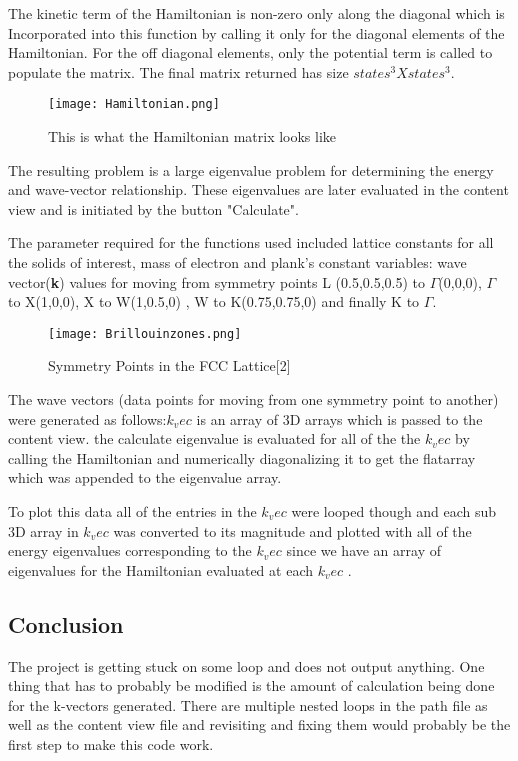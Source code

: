 \documentclass[%
 reprint,
 amsmath,amssymb,
 aps,
]{revtex4-2}
\begin{document}
The kinetic term of the Hamiltonian is non-zero only along the diagonal which is Incorporated into this function by calling it only for the diagonal elements of the Hamiltonian. For the off diagonal elements, only the potential term is called to populate the matrix. The final matrix returned has size $states^3 X states^3 $. \\

\begin{figure}[H]
\texttt{[image: Hamiltonian.png]}%
\caption{\label{fig:Hamiltonian} This is what the Hamiltonian matrix looks like}
\end{figure}

The resulting problem is a large eigenvalue problem for determining the energy and wave-vector relationship. These eigenvalues are later evaluated in the content view and is initiated by the button "Calculate".

The parameter required for the functions used included lattice constants for all the solids of interest, mass of electron and plank's constant  
variables: wave vector(\textbf{k}) values for moving from symmetry points L (0.5,0.5,0.5) to $\Gamma$(0,0,0), $\Gamma$ to X(1,0,0), X to W(1,0.5,0) , W to K(0.75,0.75,0) and finally K to $\Gamma$. 

\begin{figure}[H]
\texttt{[image: Brillouinzones.png]}%
\caption{\label{fig:Hamiltonian} Symmetry Points in the FCC Lattice[2]}
\end{figure}


The wave vectors (data points for moving from one symmetry point to another) were generated as follows:$k_vec$  is an array of 3D arrays which is passed to the content view. the calculate eigenvalue is evaluated for all of the the $k_vec$ by calling the Hamiltonian and numerically diagonalizing it to get the flatarray which was appended to the eigenvalue array. 

To plot this data all of the entries in the $k_vec$ were looped though and each sub 3D array in $k_vec$ was converted to its magnitude and plotted with all of the energy eigenvalues corresponding to the $k_vec$ since we have an array of eigenvalues for the Hamiltonian evaluated at each $k_vec$ .

\subsection{\label{sec:level3}Conclusion}
The project is getting stuck on some loop and does not output anything. One thing that has to probably be modified is the amount of calculation being done for the k-vectors generated. There are multiple nested loops in the path file as well as the content view file and revisiting and fixing them would probably be the first step to make this code work. 
\end{document}
